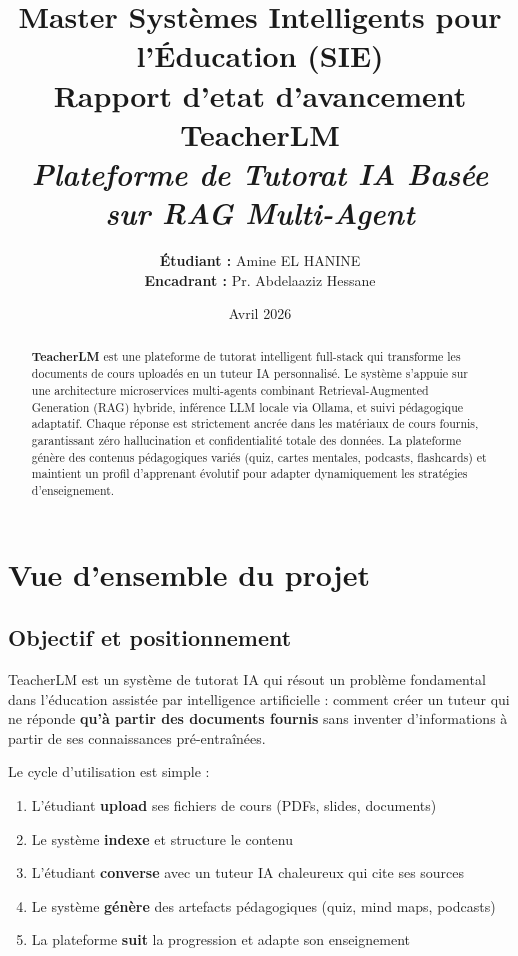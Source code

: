 \documentclass[12pt,a4paper]{article}
\title{
    \vspace{-2cm}
    \large Master Systèmes Intelligents pour l'Éducation (SIE)\\
    \vspace{0.5cm}
    \huge \textbf{Rapport d'etat d'avancement}\\
    \vspace{0.3cm}
    \LARGE \textbf{TeacherLM}\\
    \vspace{0.2cm}
    \large \textit{Plateforme de Tutorat IA Basée sur RAG Multi-Agent}
}
\author{\textbf{Étudiant :} Amine EL HANINE \\ \textbf{Encadrant :} Pr. Abdelaaziz Hessane}
\date{Avril 2026}
\begin{document}
\maketitle
\thispagestyle{empty}

\begin{abstract}
\textbf{TeacherLM} est une plateforme de tutorat intelligent full-stack qui transforme les documents de cours uploadés en un tuteur IA personnalisé. Le système s'appuie sur une architecture microservices multi-agents combinant Retrieval-Augmented Generation (RAG) hybride, inférence LLM locale via Ollama, et suivi pédagogique adaptatif. Chaque réponse est strictement ancrée dans les matériaux de cours fournis, garantissant zéro hallucination et confidentialité totale des données. La plateforme génère des contenus pédagogiques variés (quiz, cartes mentales, podcasts, flashcards) et maintient un profil d'apprenant évolutif pour adapter dynamiquement les stratégies d'enseignement.
\end{abstract}

\newpage
\tableofcontents
\newpage

\section{Vue d'ensemble du projet}

\subsection{Objectif et positionnement}

TeacherLM est un système de tutorat IA qui résout un problème fondamental dans l'éducation assistée par intelligence artificielle : comment créer un tuteur qui ne réponde \textbf{qu'à partir des documents fournis} sans inventer d'informations à partir de ses connaissances pré-entraînées.

Le cycle d'utilisation est simple :
\begin{enumerate}
    \item L'étudiant \textbf{upload} ses fichiers de cours (PDFs, slides, documents)
    \item Le système \textbf{indexe} et structure le contenu
    \item L'étudiant \textbf{converse} avec un tuteur IA chaleureux qui cite ses sources
    \item Le système \textbf{génère} des artefacts pédagogiques (quiz, mind maps, podcasts)
    \item La plateforme \textbf{suit} la progression et adapte son enseignement
\end{enumerate}
\end{document}
